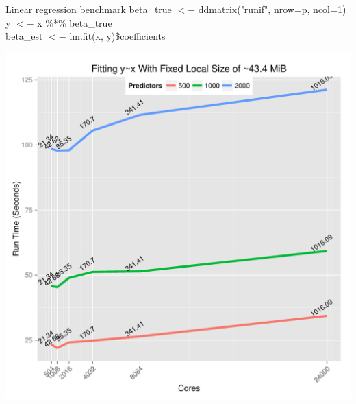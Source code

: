 \begin{frame}
  \begin{block}{Linear regression benchmark}
    \scriptsize
    beta\_true $<-$ ddmatrix("runif", nrow=p, ncol=1) \\
    y $<-$ x \%*\% beta\_true \\
    beta\_est $<-$ lm.fit(x, y)\$coefficients
    \begin{center}
      \includegraphics[trim=3mm 1mm 2mm
      11mm,clip,height=.77\textheight]{../common/pics/benchmarks/lmfit2}
    \end{center}
  \end{block}
\end{frame}

